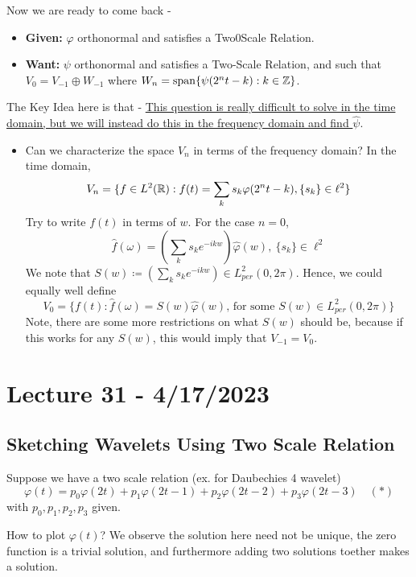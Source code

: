 \documentclass{article}
\begin{document}
{Now we are ready to come back - 
\begin{itemize}
    \item \textbf{Given: }$\varphi$ orthonormal and satisfies a Two0Scale Relation.
    \item \textbf{Want: }$\psi$ orthonormal and satisfies a Two-Scale Relation, and such that $V_0 = V_{-1} \oplus W_{-1}$ where $W_n = \operatorname{span} \{\psi(2^n t - k): k \in \mathbb{Z}\}$.
\end{itemize}

The Key Idea here is that - \ul{This question is really difficult to solve in the time domain, but we will instead do this in the frequency domain and find $\widehat{\psi}$}.

\begin{itemize}
    \item Can we characterize the space $V_n$ in terms of the frequency domain? In the time domain,
    \[V_n = \{f \in L^2(\mathbb{R}): f(t) = \sum_k s_k \varphi(2^{n} t - k), \{s_k\} \in \ell^2\}\]
    Try to write $f(t)$ in terms of $w$. For the case $n = 0$,
    \[\widehat{f}(\omega) = (\sum_{k} s_k e^{-ikw}) \widehat{\varphi}(w),\ \{s_k\} \in \ell^2\]
    We note that $S(w) \coloneqq (\sum_{k} s_k e^{-ikw}) \in L^2_{per}(0, 2\pi)$. Hence, we could equally well define
    \[V_0 = \{f(t): \widehat{f}(\omega) = S(w) \widehat{\varphi}(w) \text{, for some } S(w) \in L^2_{per}(0, 2\pi)\} \]
    Note, there are some more restrictions on what $S(w)$ should be, because if this works for any $S(w)$, this would imply that $V_{-1} = V_0$.
\end{itemize}

\newpage
\section{Lecture 31 - 4/17/2023}

\subsection{Sketching Wavelets Using Two Scale Relation}

Suppose we have a two scale relation (ex. for Daubechies 4 wavelet)
\[\varphi(t) = p_0 \varphi(2t) + p_1 \varphi(2t - 1) + p_2 \varphi(2t - 2) + p_3 \varphi(2t - 3) \quad (*)\]
with $p_0, p_1, p_2, p_3$ given.

\begin{question}
    How to plot $\varphi(t)$? We observe the solution here need not be unique, the zero function is a trivial solution, and furthermore adding two solutions toether makes a solution.
\end{question}

}
\end{document}
